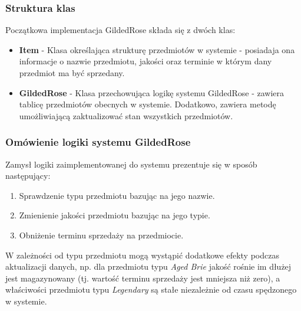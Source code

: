 \documentclass[a4paper, 11pt]{article}
\begin{document}
\subsubsection{Struktura klas}
Początkowa implementacja GildedRose składa się z dwóch klas:
\begin{itemize}
 \item \textbf{Item} - Klasa określająca strukturę przedmiotów w systemie - posiadaja ona informacje o nazwie przedmiotu, jakości oraz terminie w którym dany przedmiot ma być sprzedany.
 \item \textbf{GildedRose} - Klasa przechowująca logikę systemu GildedRose - zawiera tablicę przedmiotów obecnych w systemie. Dodatkowo, zawiera metodę umożliwiającą zaktualizować stan wszystkich przedmiotów.
\end{itemize}
\subsubsection{Omówienie logiki systemu GildedRose}
Zamysł logiki zaimplementowanej do systemu prezentuje się w sposób następujący:
\begin{enumerate}
 \item Sprawdzenie typu przedmiotu bazując na jego nazwie.
 \item Zmienienie jakości przedmiotu bazując na jego typie.
 \item Obniżenie terminu sprzedaży na przedmiocie.
\end{enumerate}
W zależności od typu przedmiotu mogą wystąpić dodatkowe efekty podczas aktualizacji danych, np. dla przedmiotu typu \textit{Aged Brie} jakość rośnie im dłużej jest magazynowany (tj. wartość terminu sprzedaży jest mniejsza niż zero), a właściwości przedmiotu typu \textit{Legendary} są stałe niezależnie od czasu spędzonego w systemie.
\end{document}
